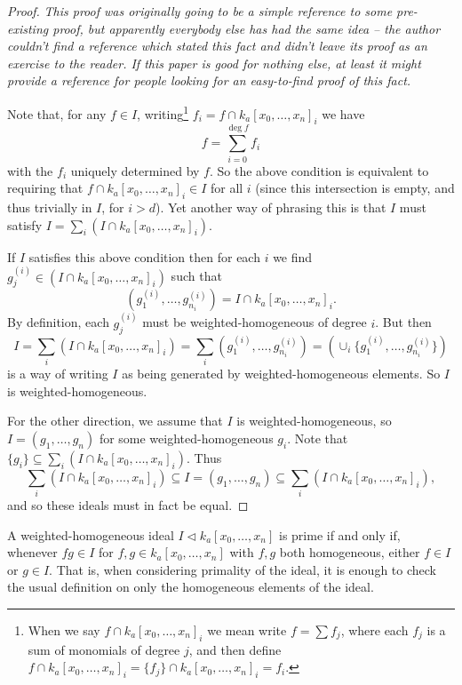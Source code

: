 \documentclass[10pt,notitlepage]{article}
\numberwithin{equation}{subsection}
\newcommand{\kazn}{k_a[x_0,\ldots,x_n]}
\begin{document}
\begin{proof}
    \emph{This proof was originally going to be a simple reference to some pre-existing proof, but apparently everybody else has had the same idea -- the author couldn't find a reference which stated this fact and didn't leave its proof as an exercise to the reader.
    If this paper is good for nothing else, at least it might provide a reference for people looking for an easy-to-find proof of this fact.}

    \bigskip

    Note that, for any $f\in I$, writing\footnote{%
        When we say $f\cap\kazn_i$ we mean write $f=\sum f_j$, where each $f_j$ is a sum of monomials of degree $j$, and then define $f\cap\kazn_i=\{f_j\}\cap\kazn_i=f_i$.
    } $f_i=f\cap\kazn_i$ we have
    \[f=\sum_{i=0}^{\deg f}f_i\]
    with the $f_i$ uniquely determined by $f$.
    So the above condition is equivalent to requiring that $f\cap\kazn_i\in I$ for all $i$ (since this intersection is empty, and thus trivially in $I$, for $i>d$).
    Yet another way of phrasing this is that $I$ must satisfy $I = \sum_i (I\cap\kazn_i)$.

    If $I$ satisfies this above condition then for each $i$ we find $g_j^{(i)}\in(I\cap\kazn_i)$ such that
    \[
        (g_1^{(i)},\ldots,g_{n_i}^{(i)})=I\cap\kazn_i.
    \]
    By definition, each $g_j^{(i)}$ must be weighted-homogeneous of degree $i$.
    But then
    \[
        I = \sum_i (I\cap\kazn_i) = \sum_i (g_1^{(i)},\ldots,g_{n_i}^{(i)}) = (\cup_i\{g_1^{(i)},\ldots,g_{n_i}^{(i)}\})
    \]
    is a way of writing $I$ as being generated by weighted-homogeneous elements.
    So $I$ is weighted-homogeneous.

    For the other direction, we assume that $I$ is weighted-homogeneous, so $I=(g_1,\ldots,g_n)$ for some weighted-homogeneous $g_i$.
    Note that $\{g_i\}\subseteq\sum_i(I\cap\kazn_i)$.
    Thus
    \[
        \sum_i(I\cap\kazn_i) \subseteq I = (g_1,\ldots,g_n) \subseteq \sum_i(I\cap\kazn_i),
    \]
    and so these ideals must in fact be equal.
\end{proof}

\begin{lemma}\label{lem:wh-prime}
    A weighted-homogeneous ideal $I\triangleleft\kazn$ is prime if and only if, whenever $fg\in I$ for $f,g\in\kazn$ with $f,g$ both homogeneous, either $f\in I$ or $g\in I$.
    That is, when considering primality of the ideal, it is enough to check the usual definition on only the homogeneous elements of the ideal.
\end{lemma}
\end{document}
